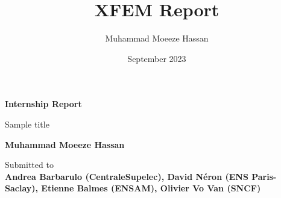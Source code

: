 



\graphicspath{{plots/}}

\title{XFEM Report}
\author{Muhammad Moeeze Hassan}
\date{September 2023}




\dominitoc

\begin{titlepage}
    \begin{center}
        \vspace*{1cm}
            
        \Huge
        \textbf{Internship Report}
            
        \vspace{0.5cm}
        \LARGE
        Sample title

            
        \vspace{1cm}
            
        \textbf{Muhammad Moeeze Hassan}
            
        \vfill
            
        Submitted to\\
        \textbf{Andrea Barbarulo (CentraleSupelec), David Néron (ENS Paris-Saclay), Etienne Balmes (ENSAM), Olivier Vo Van (SNCF)}
            
        \vspace{0.4cm}
            

\end{center}
\end{titlepage}

